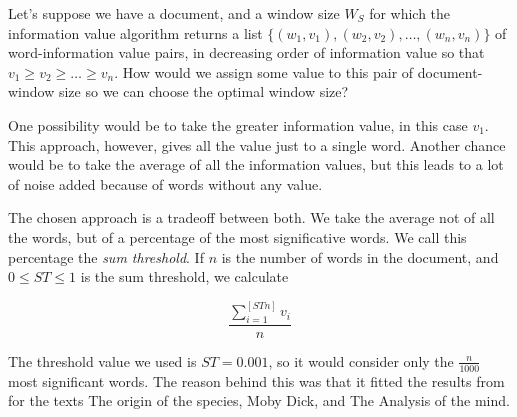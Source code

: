 \documentclass{pnastwo}
\begin{document}
\begin{article}
Let's suppose we have a document, and a window size $W_S$ for which the information value algorithm returns a list $\{(w_1, v_1), (w_2, v_2), \dots ,(w_n, v_n) \}$ of word-information value pairs, in decreasing order of information value so that $v_1 \geq v_2 \geq \dots \geq v_n$. How would we assign some value to this pair of document-window size so we can choose the optimal window size?

One possibility would be to take the greater information value, in this case $v_1$. This approach, however, gives all the value just to a single word. Another chance would be to take the average of all the information values, but this leads to a lot of noise added because of words without any value.


The chosen approach is a tradeoff between both. We take the average not of all the words, but of a percentage of the most significative words. We call this percentage the \emph{sum threshold}. If $n$ is the number of words in the document, and $0 \leq ST \leq 1$ is the sum threshold, we calculate

\begin{equation}
  \frac{\sum_{i=1}^{[ST n]}v_i}{n} 
\end{equation}


The threshold value we used is $ST=0.001$, so it would consider only the $\frac{n}{1000}$ most significant words. The reason behind this was that it fitted the results from \cite{DARWIN} for the texts The origin of the species, Moby Dick, and  The Analysis of the mind.


\end{article}
\end{document}
